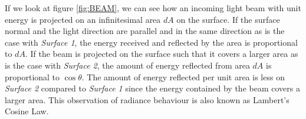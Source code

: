 If we look at figure \ref{fig:BEAM}, we can see how an incoming light beam with unit energy is projected on an infinitesimal area $dA$ on the surface. If the surface normal and the light direction are parallel and in the same direction as is the case with {\it Surface 1}, the energy received and reflected by the area is proportional to $dA$. If the beam is projected on the surface such that it covers a larger area as is the case with {\it Surface 2}, the amount of energy reflected from area $dA$ is proportional to $\cos \theta$. The amount of energy reflected per unit area is less on {\it Surface 2} compared to {\it Surface 1} since the energy contained by the beam covers a larger area. This observation of radiance behaviour is also known as Lambert's Cosine Law. 


